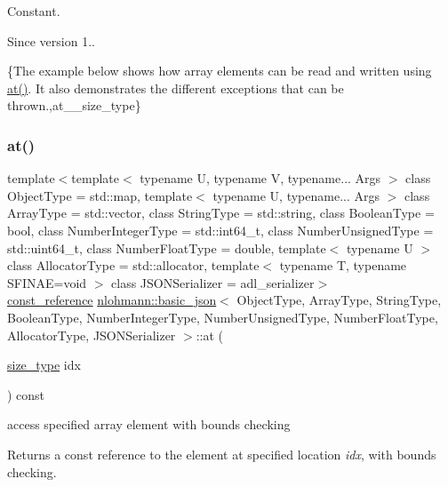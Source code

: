 Constant.

\begin{DoxySince}{Since}
version 1..
\end{DoxySince}
\{The example below shows how array elements can be read and written using {\ttfamily \mbox{\hyperlink{classnlohmann_1_1basic__json_a73ae333487310e3302135189ce8ff5d8}{at()}}}. It also demonstrates the different exceptions that can be thrown.,at\+\_\+\+\_\+size\+\_\+type\} \mbox{\label{classnlohmann_1_1basic__json_ab157adb4de8475b452da9ebf04f2de15}} 
\subsubsection{\texorpdfstring{at()}{at()}\hspace{0.1cm}{\footnotesize\ttfamily [2/6]}}
{\footnotesize\ttfamily template$<$template$<$ typename U, typename V, typename... Args $>$ class Object\+Type = std\+::map, template$<$ typename U, typename... Args $>$ class Array\+Type = std\+::vector, class String\+Type  = std\+::string, class Boolean\+Type  = bool, class Number\+Integer\+Type  = std\+::int64\+\_\+t, class Number\+Unsigned\+Type  = std\+::uint64\+\_\+t, class Number\+Float\+Type  = double, template$<$ typename U $>$ class Allocator\+Type = std\+::allocator, template$<$ typename T, typename S\+F\+I\+N\+A\+E=void $>$ class J\+S\+O\+N\+Serializer = adl\+\_\+serializer$>$ \\
\mbox{\hyperlink{classnlohmann_1_1basic__json_a4057c5425f4faacfe39a8046871786ca}{const\+\_\+reference}} \mbox{\hyperlink{classnlohmann_1_1basic__json}{nlohmann\+::basic\+\_\+json}}$<$ Object\+Type, Array\+Type, String\+Type, Boolean\+Type, Number\+Integer\+Type, Number\+Unsigned\+Type, Number\+Float\+Type, Allocator\+Type, J\+S\+O\+N\+Serializer $>$\+::at (\begin{DoxyParamCaption}\item[{\mbox{\hyperlink{classnlohmann_1_1basic__json_a39f2cd0b58106097e0e67bf185cc519b}{size\+\_\+type}}}]{idx }\end{DoxyParamCaption}) const\hspace{0.3cm}{\ttfamily [inline]}}



access specified array element with bounds checking 

Returns a const reference to the element at specified location {\itshape idx}, with bounds checking.


